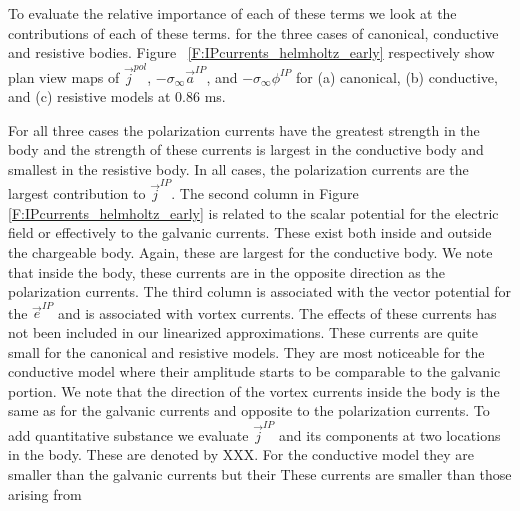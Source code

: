 \documentclass[extra,mreferee]{gji}
\newcommand{\siginf}{\sigma_\infty}
\renewcommand {\j}  { {\vec j} }
\newcommand {\e}  { {\vec e} }
\begin{document}
To evaluate the relative importance of each of these terms we look at the contributions of each of these terms.  for the three cases of canonical, conductive and resistive bodies. 
Figure ~\ref{F:IPcurrents_helmholtz_early} respectively show plan view maps of $\j^{pol}$, $-\siginf \vec{a}^{IP}$, and $-\siginf \phi^{IP}$ for (a) canonical, (b) conductive, and (c) resistive models at 0.86 ms. 

For all three cases the polarization currents have the greatest strength in the body and the strength of these currents is largest in the conductive body and smallest in the resistive body.
In all cases, the polarization currents are the largest contribution to $\j^{IP}$. 
The second column in Figure \ref{F:IPcurrents_helmholtz_early} is related to the scalar potential for the electric field or effectively to the galvanic currents. 
These exist both inside and outside the chargeable body.
Again, these are largest for the conductive body. 
We note that inside the body, these currents are in the opposite direction as the polarization currents. 
The third column is associated with the vector potential for the $\e^{IP}$ and is associated with vortex currents. 
The effects of these currents has not been included in our linearized approximations. These currents are quite small for the canonical and resistive models. They are most noticeable for the conductive model where their amplitude starts to be comparable to the galvanic portion. We note that the direction of the vortex currents inside the body is the same as for the galvanic currents and opposite to the polarization currents. 
To add quantitative substance we evaluate $\j^{IP} $ and its components at two locations in the body. These are denoted by XXX. For the conductive model they are smaller than the galvanic currents but their These currents are smaller than those arising from 
\end{document}

